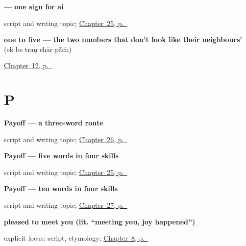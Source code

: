 \noindent\begin{minipage}[t]{\linewidth}
\raggedright
\textbf{ — one sign for ai}\par
\footnotesize script and writing topic; \hyperref[ch:gu-hand-money-map]{Chapter~25, p.~\pageref*{ch:gu-hand-money-map}}
\end{minipage}\par\smallskip

\noindent\begin{minipage}[t]{\linewidth}
\raggedright
\textbf{one to five — the two numbers that don't look like their neighbours'}\enspace\emph{    }\enspace(ek be traṇ chār pā̃ch)\par
\footnotesize \hyperref[ch:numbers-one-to-five]{Chapter~12, p.~\pageref*{ch:numbers-one-to-five}}
\end{minipage}\par\smallskip

\section*{P}

\noindent\begin{minipage}[t]{\linewidth}
\raggedright
\textbf{Payoff — a three-word route}\par
\footnotesize script and writing topic; \hyperref[ch:gu-city-school-road]{Chapter~26, p.~\pageref*{ch:gu-city-school-road}}
\end{minipage}\par\smallskip

\noindent\begin{minipage}[t]{\linewidth}
\raggedright
\textbf{Payoff — five words in four skills}\par
\footnotesize script and writing topic; \hyperref[ch:gu-hand-money-map]{Chapter~25, p.~\pageref*{ch:gu-hand-money-map}}
\end{minipage}\par\smallskip

\noindent\begin{minipage}[t]{\linewidth}
\raggedright
\textbf{Payoff — ten words in four skills}\par
\footnotesize script and writing topic; \hyperref[ch:gu-village-shop-ten]{Chapter~27, p.~\pageref*{ch:gu-village-shop-ten}}
\end{minipage}\par\smallskip

\noindent\begin{minipage}[t]{\linewidth}
\raggedright
\textbf{pleased to meet you (lit. \textquotedblleft{}meeting you, joy happened\textquotedblright{})}\enspace\emph{   }\par
\footnotesize explicit focus: script, etymology; \hyperref[ch:introductions]{Chapter~8, p.~\pageref*{ch:introductions}}
\end{minipage}\par\smallskip

